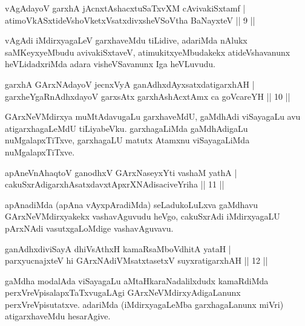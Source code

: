 \begin{shl}
vAgAdayoV garxhA jAcnxtAshacxtuSaTxvXM cAvivakiSxtamf |\\
atimoVkASxtideVshoVketxVsatxdivxsheVSoV\s tha BaNayxteV \hfill || 9 ||
\end{shl}

\begin{artha}
vAgAdi iMdirxyagaLeV garxhaveMdu tiLidive, adariMda nAlukx saMKeyxyeMbudu avivakiSxtaveV, atimukitxyeMbudakekx atideVshavanunx heVLidadxriMda adara visheVSavanunx Iga heVLuvudu.
\end{artha}

\begin{shl}
garxhA GArxNAdayoV jecnxVyA ganAdhxdAyxsatxdatigarxhAH |\\
garxheYgaRnAdhxdayoV garxsAtx garxhAshAcx\s \s tAmx ca goVcareYH \hfill || 10 ||
\end{shl}

\begin{artha}
GArxNeVMdirxya muMtAdavugaLu garxhaveMdU, gaMdhAdi viSayagaLu avu atigarxhagaLeMdU tiLiyabeVku. garxhagaLiMda gaMdhAdigaLu nuMgalapxTiTxve, garxhagaLU matutx Atamxnu viSayagaLiMda nuMgalapxTiTxve.
\end{artha}

\begin{shl}
apAneVnA\s \s haqtoV ganodhxV GArxNaseyxYti vashaM yathA |\\
cakuSxrAdigarxhAsatxdavxtApxrXNAdisaciveYriha \hfill || 11 ||
\end{shl}

\begin{artha}
apAnadiMda (apAna vAyxpAradiMda) seLadukoLuLxva gaMdhavu GArxNeVMdirxyakekx vashavAguvudu heVgo, cakuSxrAdi iMdirxyagaLU pArxNAdi vasutxgaLoMdige vashavAguvavu.
\end{artha}

\begin{shl}
ganAdhxdiviSayA dhiVsAthxH kamaRsaMboVdhitA yataH |\\
parxyucnajxteV hi GArxNAdiVMsatxtasetxV suyxratigarxhAH \hfill || 12 ||
\end{shl}

\begin{artha}
gaMdha modalAda viSayagaLu aMtaHkaraNadalilxdudx kamaRdiMda perxVreVpisalapxTaTxvugaLAgi GArxNeVMdirxyAdigaLanunx perxVreVpisutatxve. adariMda (iMdirxyagaLeMba garxhagaLanunx miVri) atigarxhaveMdu hesarAgive.
\end{artha}


